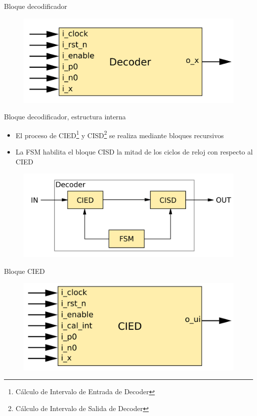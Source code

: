 \documentclass[xcolor=table]{beamer}
\begin{document}
\begin{frame}{Bloque decodificador}
    \begin{figure}
  \centering
  \includegraphics[width=0.70\paperwidth]{Diagramas/decoder.png}%
\end{figure}
\end{frame}

\begin{frame}{Bloque decodificador, estructura interna}
 
 \begin{itemize}
    \item  El proceso de CIED\footnote{Cálculo de Intervalo de Entrada de Decoder} y CISD\footnote{Cálculo de Intervalo de Salida de Decoder} se realiza mediante bloques recursivos
    \item La FSM habilita el bloque CISD la mitad de los ciclos de reloj con respecto al CIED
\end{itemize}
 
 \begin{figure}
  \centering
  \includegraphics[width=0.70\paperwidth]{Diagramas/internal_decoder.png}%
\end{figure}
\end{frame}





\begin{frame}{Bloque CIED}

 \begin{figure}
  \centering
  \includegraphics[width=0.70\paperwidth]{Diagramas/cied.png}%
\end{figure}
\end{frame}
\end{document}
